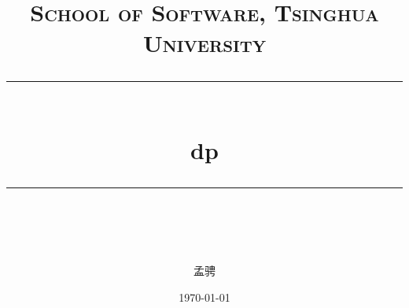 \documentclass[ paper=a4,UTF8, fontsize=11pt]{ctexart}
\numberwithin{equation}{section} %
\numberwithin{figure}{section} %
\numberwithin{table}{section} %
\begin{document}
\begin{titlepage}
\newcommand{\horrule}[1]{\rule{\linewidth}{#1}} %

\title{	
\normalfont \normalsize
\textsc{School of Software, Tsinghua University} \\ [25pt] %
\horrule{0.5pt} \\[0.4cm] %
\huge dp \\ %
\horrule{2pt} \\[0.5cm] %
}


\author{孟骋} %
\date{\normalsize\today} %
\maketitle %
\end{titlepage}
\end{document}
